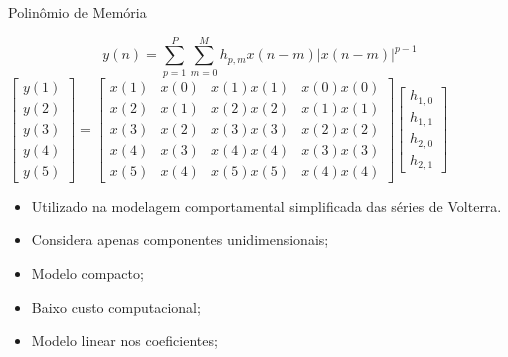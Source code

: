 \documentclass{if-beamer}
\begin{document}
\begin{frame}{Polinômio de Memória}
	\begin{minipage}{0.5\textwidth}
		\raggedleft
		\scriptsize
		\begin{equation}
			y(n) = \sum_{p=1}^{P} \sum_{m=0}^{M} h_{p,m} x(n-m) |x(n-m)|^{p-1}
		\end{equation}
			$
				\begin{bmatrix}
					y(1) \\
					y(2) \\
					y(3) \\
					y(4) \\
					y(5)
				\end{bmatrix}
				=
				\begin{bmatrix}
					x(1) & x(0) & x(1)x(1) & x(0)x(0) \\
					x(2) & x(1) & x(2)x(2) & x(1)x(1) \\
					x(3) & x(2) & x(3)x(3) & x(2)x(2) \\
					x(4) & x(3) & x(4)x(4) & x(3)x(3) \\
					x(5) & x(4) & x(5)x(5) & x(4)x(4)
				\end{bmatrix}
				\begin{bmatrix}
					h_{1,0} \\
					h_{1,1} \\
					h_{2,0} \\
					h_{2,1}
				\end{bmatrix}
			$
	
			
		
	\end{minipage}%
	\hspace{0.1\textwidth}
	\begin{minipage}{0.5\textwidth}
		\begin{itemize}
			\item Utilizado na modelagem comportamental simplificada das séries de Volterra.
			\item Considera apenas componentes unidimensionais;
			\item Modelo compacto;
			\item Baixo custo computacional;
			\item Modelo linear nos coeficientes;
		\end{itemize}
	\end{minipage}
\end{frame}
\end{document}
